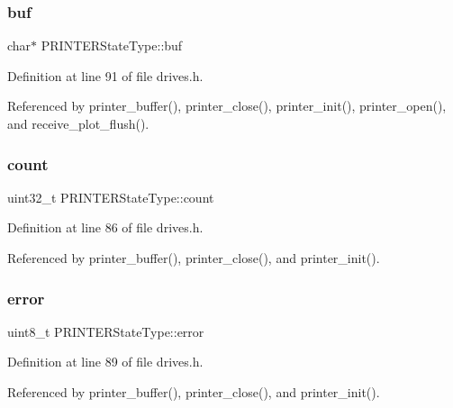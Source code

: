 \subsubsection{\texorpdfstring{buf}{buf}}
{\footnotesize\ttfamily char$\ast$ P\+R\+I\+N\+T\+E\+R\+State\+Type\+::buf}



Definition at line 91 of file drives.\+h.



Referenced by printer\+\_\+buffer(), printer\+\_\+close(), printer\+\_\+init(), printer\+\_\+open(), and receive\+\_\+plot\+\_\+flush().

\mbox{\label{structPRINTERStateType_ae115fc351910f3801e37b31f254fb8f4}} 
\subsubsection{\texorpdfstring{count}{count}}
{\footnotesize\ttfamily uint32\+\_\+t P\+R\+I\+N\+T\+E\+R\+State\+Type\+::count}



Definition at line 86 of file drives.\+h.



Referenced by printer\+\_\+buffer(), printer\+\_\+close(), and printer\+\_\+init().

\mbox{\label{structPRINTERStateType_a6e5b550f5396901febd5475445132dd0}} 
\subsubsection{\texorpdfstring{error}{error}}
{\footnotesize\ttfamily uint8\+\_\+t P\+R\+I\+N\+T\+E\+R\+State\+Type\+::error}



Definition at line 89 of file drives.\+h.



Referenced by printer\+\_\+buffer(), printer\+\_\+close(), and printer\+\_\+init().

\mbox{\label{structPRINTERStateType_a791c78d68d169f9d2e60d34b890e520a}} 
